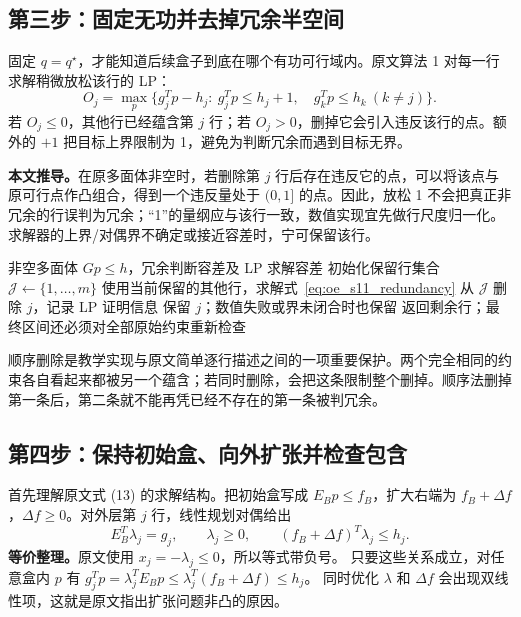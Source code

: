 \subsection{第三步：固定无功并去掉冗余半空间}

固定 $q=q^\star$，才能知道后续盒子到底在哪个有功可行域内。原文算法 1 对每一行求解稍微放松该行的 LP：
\begin{equation}
 O_j=\max_p\{g_j^Tp-h_j:\ g_j^Tp\le h_j+1,\quad
                 g_k^Tp\le h_k\ (k\ne j)\}.
 \label{eq:oe_s11_redundancy}
\end{equation}
若 $O_j\le0$，其他行已经蕴含第 $j$ 行；若 $O_j>0$，删掉它会引入违反该行的点。额外的 $+1$ 把目标上界限制为 1，避免为判断冗余而遇到目标无界。

\textbf{本文推导。}在原多面体非空时，若删除第 $j$ 行后存在违反它的点，可以将该点与原可行点作凸组合，得到一个违反量处于 $(0,1]$ 的点。因此，放松 1 不会把真正非冗余的行误判为冗余；“1”的量纲应与该行一致，数值实现宜先做行尺度归一化。求解器的上界/对偶界不确定或接近容差时，宁可保留该行。

\begin{algorithm}[tbp]
\caption{S11 去冗余步骤的教学安全实现：顺序删除}
\label{alg:oe_s11_redundancy}
\begin{algorithmic}[1]
\Require 非空多面体 $Gp\le h$，冗余判断容差及 LP 求解容差
\State 初始化保留行集合 $\mathcal J\gets\{1,\ldots,m\}$
 \State 使用当前保留的其他行，求解式~\eqref{eq:oe_s11_redundancy}
   \State 从 $\mathcal J$ 删除 $j$，记录 LP 证明信息
 \Else
   \State 保留 $j$；数值失败或界未闭合时也保留
 \EndIf
\EndFor
\State 返回剩余行；最终区间还必须对全部原始约束重新检查
\end{algorithmic}
\end{algorithm}

顺序删除是教学实现与原文简单逐行描述之间的一项重要保护。两个完全相同的约束各自看起来都被另一个蕴含；若同时删除，会把这条限制整个删掉。顺序法删掉第一条后，第二条就不能再凭已经不存在的第一条被判冗余。

\subsection{第四步：保持初始盒、向外扩张并检查包含}

首先理解原文式 (13) 的求解结构。把初始盒写成
$E_Bp\le f_B$，扩大右端为 $f_B+\Delta f$，$\Delta f\ge0$。对外层第 $j$ 行，线性规划对偶给出
\begin{equation}
 E_B^T\lambda_j=g_j,\qquad\lambda_j\ge0,\qquad
 (f_B+\Delta f)^T\lambda_j\le h_j.
 \label{eq:oe_s11_dual_containment}
\end{equation}
\textbf{等价整理。}原文使用 $x_j=-\lambda_j\le0$，所以等式带负号。
只要这些关系成立，对任意盒内 $p$ 有
$g_j^Tp=\lambda_j^TE_Bp\le\lambda_j^T(f_B+\Delta f)\le h_j$。
同时优化 $\lambda$ 和 $\Delta f$ 会出现双线性项，这就是原文指出扩张问题非凸的原因。

